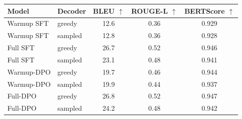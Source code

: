 \begin{tabular}{llccc}
\toprule
Model & Decoder & BLEU $\uparrow$ & ROUGE-L $\uparrow$ & BERTScore $\uparrow$ \\
\midrule
Warmup SFT & greedy & 12.6 & 0.36 & 0.929 \\
Warmup SFT & sampled & 12.8 & 0.36 & 0.928 \\
Full SFT & greedy & 26.7 & 0.52 & 0.946 \\
Full SFT & sampled & 23.1 & 0.48 & 0.941 \\
Warmup-DPO & greedy & 19.7 & 0.46 & 0.944 \\
Warmup-DPO & sampled & 19.9 & 0.44 & 0.937 \\
Full-DPO & greedy & 26.8 & 0.52 & 0.947 \\
Full-DPO & sampled & 24.2 & 0.48 & 0.942 \\
\bottomrule
\end{tabular}
